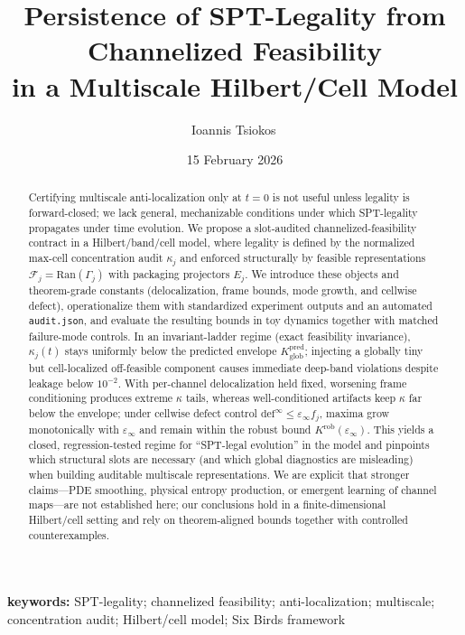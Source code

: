 \documentclass[11pt]{article}
\title{Persistence of SPT-Legality from Channelized Feasibility\\
in a Multiscale Hilbert/Cell Model}
\author{Ioannis Tsiokos\,\orcidlink{0009-0009-7659-5964}}
\date{15 February 2026}
\newcommand{\printaffiliation}{\begin{center}\small \end{center}}
\begin{document}
\maketitle
\thispagestyle{firstpage}
\printaffiliation

\begin{abstract}
Certifying multiscale anti-localization only at $t=0$ is not useful unless legality is forward-closed; we lack general, mechanizable conditions under which SPT-legality propagates under time evolution.
We propose a slot-audited channelized-feasibility contract in a Hilbert/band/cell model, where legality is defined by the normalized max-cell concentration audit $\kappa_j$ and enforced structurally by feasible representations $\mathcal{F}_j=\mathrm{Ran}(\Gamma_j)$ with packaging projectors $E_j$.
We introduce these objects and theorem-grade constants (delocalization, frame bounds, mode growth, and cellwise defect), operationalize them with standardized experiment outputs and an automated \texttt{audit.json}, and evaluate the resulting bounds in toy dynamics together with matched failure-mode controls.
In an invariant-ladder regime (exact feasibility invariance), $\kappa_j(t)$ stays uniformly below the predicted envelope $K^{\mathrm{pred}}_{\mathrm{glob}}$; injecting a globally tiny but cell-localized off-feasible component causes immediate deep-band violations despite leakage below $10^{-2}$.
With per-channel delocalization held fixed, worsening frame conditioning produces extreme $\kappa$ tails, whereas well-conditioned artifacts keep $\kappa$ far below the envelope; under cellwise defect control $\mathrm{def}^{\infty}\le \varepsilon_\infty f_j$, maxima grow monotonically with $\varepsilon_\infty$ and remain within the robust bound $K^{\mathrm{rob}}(\varepsilon_\infty)$.
This yields a closed, regression-tested regime for ``SPT-legal evolution'' in the model and pinpoints which structural slots are necessary (and which global diagnostics are misleading) when building auditable multiscale representations.
We are explicit that stronger claims---PDE smoothing, physical entropy production, or emergent learning of channel maps---are not established here; our conclusions hold in a finite-dimensional Hilbert/cell setting and rely on theorem-aligned bounds together with controlled counterexamples.
\end{abstract}

\noindent\textbf{keywords:} SPT-legality; channelized feasibility; anti-localization; multiscale; concentration audit; Hilbert/cell model; Six Birds framework
\end{document}
